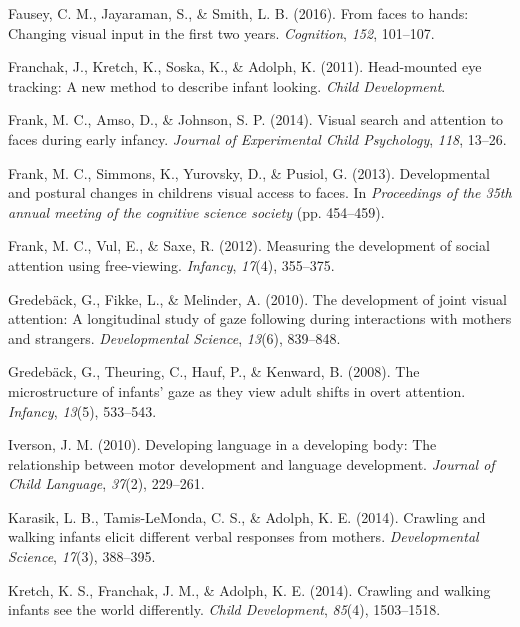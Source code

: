 \documentclass[10pt, letterpaper]{article}
\begin{document}
\hypertarget{ref-fausey2016}{}
Fausey, C. M., Jayaraman, S., \& Smith, L. B. (2016). From faces to
hands: Changing visual input in the first two years. \emph{Cognition},
\emph{152}, 101--107.

\hypertarget{ref-franchak2011}{}
Franchak, J., Kretch, K., Soska, K., \& Adolph, K. (2011). Head-mounted
eye tracking: A new method to describe infant looking. \emph{Child
Development}.

\hypertarget{ref-frank2014visual}{}
Frank, M. C., Amso, D., \& Johnson, S. P. (2014). Visual search and
attention to faces during early infancy. \emph{Journal of Experimental
Child Psychology}, \emph{118}, 13--26.

\hypertarget{ref-frank2013}{}
Frank, M. C., Simmons, K., Yurovsky, D., \& Pusiol, G. (2013).
Developmental and postural changes in childrens visual access to faces.
In \emph{Proceedings of the 35th annual meeting of the cognitive science
society} (pp. 454--459).

\hypertarget{ref-frank2012measuring}{}
Frank, M. C., Vul, E., \& Saxe, R. (2012). Measuring the development of
social attention using free-viewing. \emph{Infancy}, \emph{17}(4),
355--375.

\hypertarget{ref-gredeback2010development}{}
Gredebäck, G., Fikke, L., \& Melinder, A. (2010). The development of
joint visual attention: A longitudinal study of gaze following during
interactions with mothers and strangers. \emph{Developmental Science},
\emph{13}(6), 839--848.

\hypertarget{ref-gredeback2008microstructure}{}
Gredebäck, G., Theuring, C., Hauf, P., \& Kenward, B. (2008). The
microstructure of infants' gaze as they view adult shifts in overt
attention. \emph{Infancy}, \emph{13}(5), 533--543.

\hypertarget{ref-iverson2010}{}
Iverson, J. M. (2010). Developing language in a developing body: The
relationship between motor development and language development.
\emph{Journal of Child Language}, \emph{37}(2), 229--261.

\hypertarget{ref-karasik2014}{}
Karasik, L. B., Tamis-LeMonda, C. S., \& Adolph, K. E. (2014). Crawling
and walking infants elicit different verbal responses from mothers.
\emph{Developmental Science}, \emph{17}(3), 388--395.

\hypertarget{ref-kretch2014}{}
Kretch, K. S., Franchak, J. M., \& Adolph, K. E. (2014). Crawling and
walking infants see the world differently. \emph{Child Development},
\emph{85}(4), 1503--1518.
\end{document}
